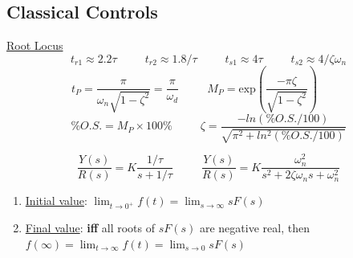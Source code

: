 \documentclass[twocolumn]{article}    %
\begin{document}
\RaggedRight
\footnotesize 

\subsection*{Classical Controls}

\noindent\underline{Root Locus}\\
\begin{equation*}
    t_{r1} \approx 2.2\tau \hspace{30pt} t_{r2} \approx 1.8 / \tau  \hspace{30pt} t_{s1} \approx 4\tau \hspace{30pt} t_{s2} \approx 4 / \zeta \omega_n
\end{equation*}
\begin{equation*}
    t_P = \frac{\pi}{\omega_n\sqrt{1-\zeta^2}}=\frac{\pi}{\omega_d} \hspace{30pt} M_P = \text{exp}\left(\frac{-\pi\zeta}{\sqrt{1-\zeta^2}}  \right) \hspace{30pt} 
\end{equation*}
\begin{equation*}
    \%O.S. = M_P \times 100\% \hspace{30pt} \zeta = \frac{-ln(\%O.S./100)}{\sqrt{\pi^2 +ln^2(\%O.S. /100)}}
\end{equation*}

\begin{equation*}
    \frac{Y(s)}{R(s)} = K\frac{1/\tau}{s + 1/\tau} \hspace{30pt} \frac{Y(s)}{R(s)} = K\frac{\omega_n^2}{s^2+2\zeta\omega_ns+\omega_n^2}
\end{equation*}
\begin{enumerate}
    \item \underline{Initial value}: \(\lim_{t\to 0^+} f(t) = \lim_{s\to \infty } sF(s)\) 
    \item \underline{Final value}: \textbf{iff} all roots of \(sF(s)\) are negative real, then \(f(\infty) = \lim_{t\to\infty} f(t) = \lim_{s\to0} sF(s)\)
\end{enumerate}
\end{document}
